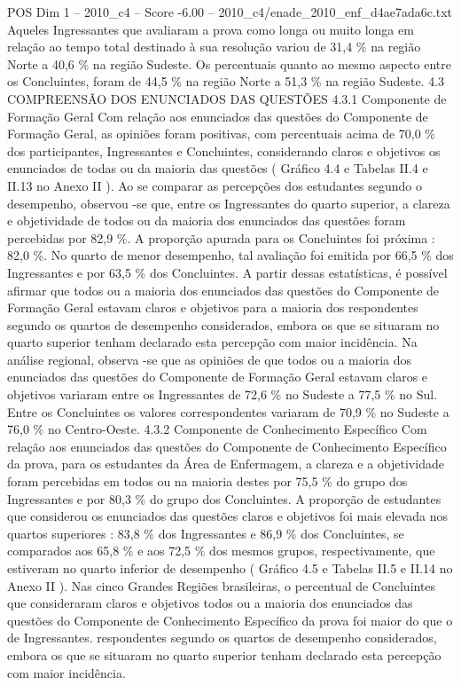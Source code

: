 \begin{textsample}{POS Dim 1 – 2010\_c4 – Score -6.00 – 2010\_c4/enade\_2010\_enf\_d4ae7ada6c.txt}
Aqueles Ingressantes que avaliaram a prova como longa ou muito longa em relação ao tempo total destinado à sua resolução variou de 31,4 \% na região Norte a 40,6 \% na região Sudeste.
Os percentuais quanto ao mesmo aspecto entre os Concluintes, foram de 44,5 \% na região Norte a 51,3 \% na região Sudeste. 4.3 COMPREENSÃO DOS ENUNCIADOS DAS QUESTÕES 4.3.1 Componente de Formação Geral Com relação aos enunciados das questões do Componente de Formação Geral, as opiniões foram positivas, com percentuais acima de 70,0 \% dos participantes, Ingressantes e Concluintes, considerando claros e objetivos os enunciados de todas ou da maioria das questões ( Gráfico 4.4 e Tabelas II.4 e II.13 no Anexo II ).
Ao se comparar as percepções dos estudantes segundo o desempenho, observou -se que, entre os Ingressantes do quarto superior, a clareza e objetividade de todos ou da maioria dos enunciados das questões foram percebidas por 82,9 \%.
A proporção apurada para os Concluintes foi próxima : 82,0 \%.
No quarto de menor desempenho, tal avaliação foi emitida por 66,5 \% dos Ingressantes e por 63,5 \% dos Concluintes.
A partir dessas estatísticas, é possível afirmar que todos ou a maioria dos enunciados das questões do Componente de Formação Geral estavam claros e objetivos para a maioria dos respondentes segundo os quartos de desempenho considerados, embora os que se situaram no quarto superior tenham declarado esta percepção com maior incidência.
Na análise regional, observa -se que as opiniões de que todos ou a maioria dos enunciados das questões do Componente de Formação Geral estavam claros e objetivos variaram entre os Ingressantes de 72,6 \% no Sudeste a 77,5 \% no Sul.
Entre os Concluintes os valores correspondentes variaram de 70,9 \% no Sudeste a 76,0 \% no Centro-Oeste. 4.3.2 Componente de Conhecimento Específico Com relação aos enunciados das questões do Componente de Conhecimento Específico da prova, para os estudantes da Área de Enfermagem, a clareza e a objetividade foram percebidas em todos ou na maioria destes por 75,5 \% do grupo dos Ingressantes e por 80,3 \% do grupo dos Concluintes.
A proporção de estudantes que considerou os enunciados das questões claros e objetivos foi mais elevada nos quartos superiores : 83,8 \% dos Ingressantes e 86,9 \% dos Concluintes, se comparados aos 65,8 \% e aos 72,5 \% dos mesmos grupos, respectivamente, que estiveram no quarto inferior de desempenho ( Gráfico 4.5 e Tabelas II.5 e II.14 no Anexo II ).
Nas cinco Grandes Regiões brasileiras, o percentual de Concluintes que consideraram claros e objetivos todos ou a maioria dos enunciados das questões do Componente de Conhecimento Específico da prova foi maior do que o de Ingressantes. respondentes segundo os quartos de desempenho considerados, embora os que se situaram no quarto superior tenham declarado esta percepção com maior incidência.

\end{textsample}
